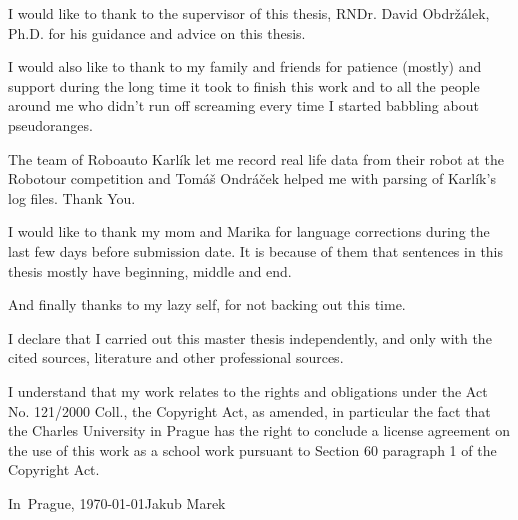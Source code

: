 

\noindent
I would like to thank to the supervisor of this thesis,
RNDr. David Obdržálek, Ph.D. for his guidance and advice on this thesis.

I would also like to thank to my family and friends for patience (mostly) and
support during the long time it took to finish this work and to all the people
around me who didn't run off screaming every time I started babbling about pseudoranges.

The team of Roboauto Karlík let me record real life data from their robot at the
Robotour competition and Tomáš Ondráček helped me with parsing of Karlík's log files.
Thank You.

I would like to thank my mom and Marika for language
corrections during the last few days before submission date.
It is because of them that sentences in this thesis mostly have beginning,
middle and end.

And finally thanks to my lazy self, for not backing out this time.

\cleartorecto

\vspace*{\fill}
\noindent
I declare that I carried out this master thesis independently, and only with the cited
sources, literature and other professional sources.

I understand that my work relates to the rights and obligations under the Act No.
121/2000 Coll., the Copyright Act, as amended, in particular the fact that the Charles
University in Prague has the right to conclude a license agreement on the use of this
work as a school work pursuant to Section 60 paragraph 1 of the Copyright Act.

\vspace{10mm}
\noindent In~Prague, \today\hspace{\fill}Jakub Marek\\
\vspace{10mm}
\cleartorecto

\tableofcontents*
\cleartorecto
